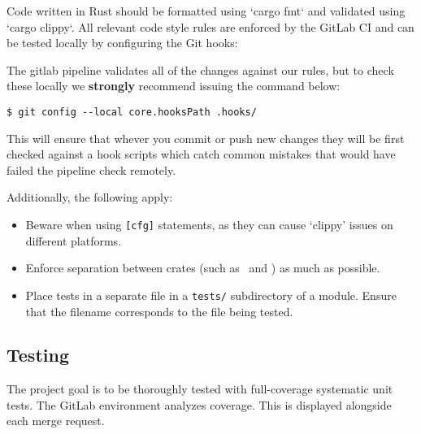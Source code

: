Code written in Rust should be formatted using `cargo fmt` and validated using `cargo clippy`.
All relevant code style rules are enforced by the GitLab CI and can be tested locally
by configuring the Git hooks:

The gitlab pipeline validates all of the changes against our rules, but to check these locally
we \textbf{strongly} recommend issuing the command below:

\begin{verbatim}
$ git config --local core.hooksPath .hooks/
\end{verbatim}

This will ensure that whever you commit or push new changes they will be first checked against
a hook scripts which catch common mistakes that would have failed the pipeline check remotely.

Additionally, the following apply:
\begin{itemize}
  \item Beware when using \verb|[cfg]| statements, as they can cause `clippy' issues on different platforms.
  \item Enforce separation between crates (such as \gourd\ and \gourdwrap) as much as possible.
  \item Place tests in a separate file in a \verb|tests/| subdirectory of a module.
        Ensure that the filename corresponds to the file being tested.
\end{itemize}

\subsection{Testing}

The project goal is to be thoroughly tested with full-coverage systematic unit tests.
The GitLab environment analyzes coverage. This is displayed alongside each merge request.
